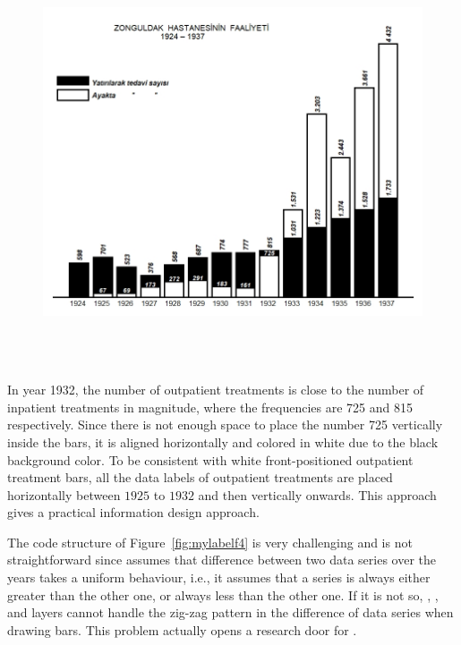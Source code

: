 \begin{figure}[hbt!]
	\centering
	\includegraphics[width=12cm,height=12cm,keepaspectratio]{Zonguldakrep.png}
\end{figure}

In year 1932, the number of outpatient treatments is close to the number of inpatient treatments in magnitude, where the frequencies are 725 and 815 respectively. Since there is not enough space to place the number 725 vertically inside the bars, it is aligned horizontally and colored in white due to the black background color. To be consistent with white front-positioned outpatient treatment bars,  
all the data labels of outpatient treatments are placed horizontally between $1925$ to $1932$ and then vertically onwards. This approach gives a practical information design approach.

The  code structure of  Figure~\ref{fig:mylabelf4} is very challenging and is not straightforward since   assumes that difference between two data series over the years takes a uniform behaviour, i.e., it assumes that a series is always either greater than the other one, or always less than the other one. If  it is not so, ,  , and  layers cannot handle the zig-zag pattern in the difference of data series when drawing bars. This problem actually opens a research door for . 

